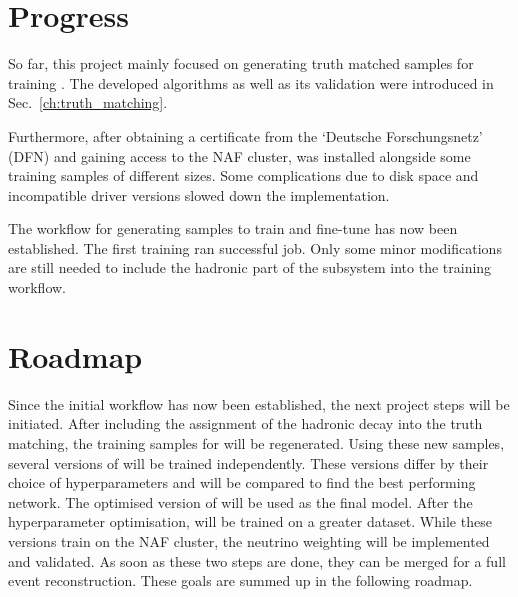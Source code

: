 \documentclass[bachelor,ngerman,english]{GAUBM}
\begin{document}
\section{Progress}
\label{sec:status:progress}
So far, this project mainly focused on generating truth matched samples for training \spanet. The developed algorithms as well as its validation were introduced in Sec.~\ref{ch:truth_matching}.  

Furthermore, after obtaining a certificate from the `Deutsche Forschungsnetz' (DFN) and gaining access to the NAF cluster, \spanet was installed alongside some training samples of different sizes. Some complications due to disk space and incompatible driver versions slowed down the implementation. 

The workflow for generating samples to train and fine-tune \spanet has now been established. The first training ran successful job. Only some minor modifications are still needed to include the hadronic part of the \HWW subsystem into the training workflow. 


\section{Roadmap}
\label{sec:status:roadmap}
Since the initial workflow has now been established, the next project steps will be initiated. After including the assignment of the hadronic \HWW decay into the truth matching, the training samples for \spanet will be regenerated. Using these new samples, several versions of \spanet will be trained independently. These versions differ by their choice of hyperparameters and will be compared to find the best performing network. The optimised version of \spanet will be used as the final model. After the hyperparameter optimisation, \spanet will be trained on a greater dataset. While these \spanet versions train on the NAF cluster, the neutrino weighting will be implemented and validated. As soon as these two steps are done, they can be merged for a full event reconstruction. These goals are summed up in the following roadmap.
\end{document}
